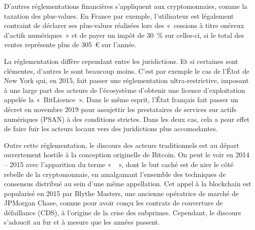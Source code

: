 D'autres réglementations financières s'appliquent aux cryptomonnaies, comme la taxation des plus-values. En France par exemple, l'utilisateur est légalement contraint de déclarer ses plus-values réalisées lors des «~cessions à titre onéreux d'actifs numériques~» et de payer un impôt de 30~\% sur celles-ci, si le total des ventes représente plus de 305~€ sur l'année. %

La réglementation diffère cependant entre les juridictions. Et si certaines sont clémentes, d'autres le sont beaucoup moins. C'est par exemple le cas de l'État de New York qui, en 2015, fait passer une réglementation ultra-restrictive, imposant à une large part des acteurs de l'écosystème d'obtenir une licence d'exploitation appelée la «~BitLicence~». Dans le même esprit, l'État français fait passer un décret en novembre 2019 pour assujettir les prestataires de services sur actifs numériques (PSAN) à des conditions strictes. Dans les deux cas, cela a pour effet de faire fuir les acteurs locaux vers des juridictions plus accomodantes.

Outre cette réglementation, le discours des acteurs traditionnels est au départ ouvertement hostile à la conception originelle de Bitcoin. On peut le voir en 2014 -- 2015 avec l'apparition du terme «~~», dont le but caché est de nier le côté rebelle de la cryptomonnaie, en amalgamant l'ensemble des techniques de consensus distribué au sein d'une même appellation. Cet appel à la blockchain est popularisé en 2015 par Blythe Masters, une ancienne opératrice de marché de JPMorgan Chase, connue pour avoir conçu les contrats de couverture de défaillance (CDS), à l'origine de la crise des subprimes. Cependant, le discours s'adoucit au fur et à mesure que les années passent. %

